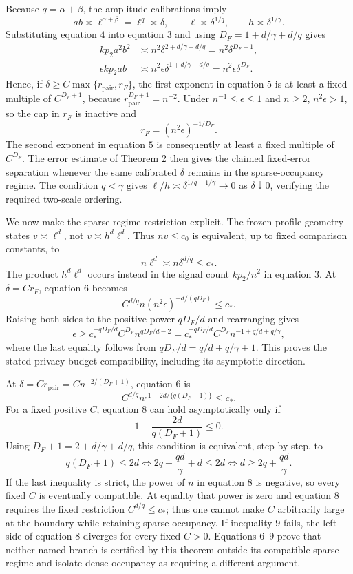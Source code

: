 Because \(q=\alpha+\beta\), the amplitude calibrations imply
\[
 ab\asymp\ell^{\alpha+\beta}=\ell^q\asymp\delta,
 \qquad
 \ell\asymp\delta^{1/q},
 \qquad
 h\asymp\delta^{1/\gamma}. \tag{4}
\]
Substituting equation \(4\) into equation \(3\) and using
\(D_F=1+d/\gamma+d/q\) gives
\[
 \begin{aligned}
 kp_2a^2b^2
 &\asymp n^2\delta^{2+d/\gamma+d/q}
 =n^2\delta^{D_F+1},\\
 \epsilon kp_2ab
 &\asymp n^2\epsilon\delta^{1+d/\gamma+d/q}
 =n^2\epsilon\delta^{D_F}. \tag{5}
 \end{aligned}
\]
Hence, if \(\delta\ge C\max\{r_{\mathrm{pair}},r_F\}\), the first exponent in equation \(5\) is at least a fixed multiple of \(C^{D_F+1}\), because \(r_{\mathrm{pair}}^{D_F+1}=n^{-2}\).  Under \(n^{-1}\le\epsilon\le1\) and \(n\ge2\), \(n^2\epsilon>1\), so the cap in \(r_F\) is inactive and
\[
 r_F=(n^2\epsilon)^{-1/D_F}.
\]
The second exponent in equation \(5\) is consequently at least a fixed multiple of \(C^{D_F}\).  The error estimate of Theorem 2 then gives the claimed fixed-error separation whenever the same calibrated \(\delta\) remains in the sparse-occupancy regime.  The condition \(q<\gamma\) gives
\(\ell/h\asymp\delta^{1/q-1/\gamma}\to0\) as \(\delta\downarrow0\), verifying the required two-scale ordering.

We now make the sparse-regime restriction explicit.  The frozen profile geometry states \(v\asymp\ell^d\), not \(v\asymp h^d\ell^d\).  Thus \(nv\le c_0\) is equivalent, up to fixed comparison constants, to
\[
 n\ell^d\asymp n\delta^{d/q}\le c_*. \tag{6}
\]
The product \(h^d\ell^d\) occurs instead in the signal count \(kp_2/n^2\) in equation \(3\).  At \(\delta=Cr_F\), equation \(6\) becomes
\[
 C^{d/q}n(n^2\epsilon)^{-d/(qD_F)}\le c_*.
\]
Raising both sides to the positive power \(qD_F/d\) and rearranging gives
\[
 \epsilon
 \ge c_*^{-qD_F/d}C^{D_F}n^{qD_F/d-2}
 =c_*^{-qD_F/d}C^{D_F}
 n^{-1+q/d+q/\gamma}, \tag{7}
\]
where the last equality follows from
\(qD_F/d=q/d+q/\gamma+1\).  This proves the stated privacy-budget compatibility, including its asymptotic direction.

At \(\delta=Cr_{\mathrm{pair}}=Cn^{-2/(D_F+1)}\), equation \(6\) is
\[
 C^{d/q}n^{,1-2d/\{q(D_F+1)\}}\le c_*. \tag{8}
\]
For a fixed positive \(C\), equation \(8\) can hold asymptotically only if
\[
 1-\frac{2d}{q(D_F+1)}\le0.
\]
Using \(D_F+1=2+d/\gamma+d/q\), this condition is equivalent, step by step, to
\[
 q(D_F+1)\le2d
 \iff 2q+\frac{qd}{\gamma}+d\le2d
 \iff d\ge2q+\frac{qd}{\gamma}. \tag{9}
\]
If the last inequality is strict, the power of \(n\) in equation \(8\) is negative, so every fixed \(C\) is eventually compatible.  At equality that power is zero and equation \(8\) requires the fixed restriction \(C^{d/q}\le c_*\); thus one cannot make \(C\) arbitrarily large at the boundary while retaining sparse occupancy.  If inequality \(9\) fails, the left side of equation \(8\) diverges for every fixed \(C>0\).  Equations \(6\)--\(9\) prove that neither named branch is certified by this theorem outside its compatible sparse regime and isolate dense occupancy as requiring a different argument.

